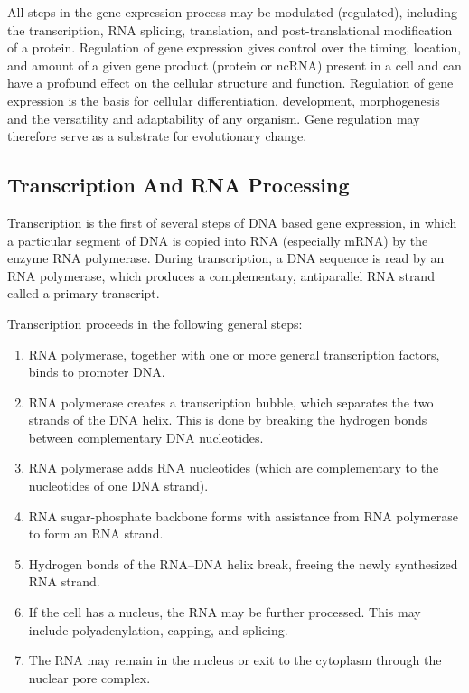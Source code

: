 All steps in the gene expression process may be modulated (regulated), including the transcription, RNA splicing, translation, and post-translational modification of a protein. Regulation of gene expression gives control over the timing, location, and amount of a given gene product (protein or ncRNA) present in a cell and can have a profound effect on the cellular structure and function. Regulation of gene expression is the basis for cellular differentiation, development, morphogenesis and the versatility and adaptability of any organism. Gene regulation may therefore serve as a substrate for evolutionary change.

\hypertarget{transcription-and-rna-processing}{%
\subsection{Transcription And RNA Processing}\label{transcription-and-rna-processing}}

\href{https://en.wikipedia.org/wiki/Transcription_(biology)}{Transcription} is the first of several steps of DNA based gene expression, in which a particular segment of DNA is copied into RNA (especially mRNA) by the enzyme RNA polymerase. During transcription, a DNA sequence is read by an RNA polymerase, which produces a complementary, antiparallel RNA strand called a primary transcript.

Transcription proceeds in the following general steps:

\begin{enumerate}
\def\labelenumi{\arabic{enumi}.}
\tightlist
\item
  RNA polymerase, together with one or more general transcription factors, binds to promoter DNA.
\item
  RNA polymerase creates a transcription bubble, which separates the two strands of the DNA helix. This is done by breaking the hydrogen bonds between complementary DNA nucleotides.
\item
  RNA polymerase adds RNA nucleotides (which are complementary to the nucleotides of one DNA strand).
\item
  RNA sugar-phosphate backbone forms with assistance from RNA polymerase to form an RNA strand.
\item
  Hydrogen bonds of the RNA--DNA helix break, freeing the newly synthesized RNA strand.
\item
  If the cell has a nucleus, the RNA may be further processed. This may include polyadenylation, capping, and splicing.
\item
  The RNA may remain in the nucleus or exit to the cytoplasm through the nuclear pore complex.
\end{enumerate}

